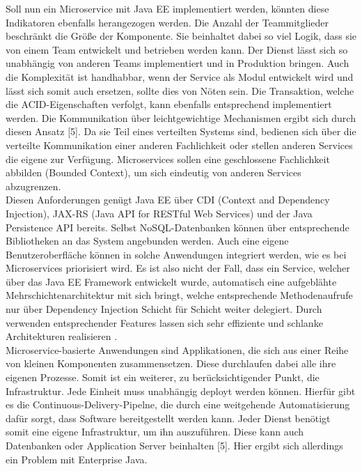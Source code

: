 Soll nun ein Microservice mit Java EE implementiert werden, könnten diese Indikatoren ebenfalls herangezogen werden. Die Anzahl der Teammitglieder beschränkt die Größe der Komponente. Sie beinhaltet dabei so viel Logik, dass sie von einem Team entwickelt und betrieben werden kann. Der Dienst lässt sich so unabhängig von anderen Teams implementiert und in Produktion bringen. Auch die Komplexität ist handhabbar, wenn der Service als Modul entwickelt wird und lässt sich somit auch ersetzen, sollte dies von Nöten sein. Die Transaktion, welche die ACID-Eigenschaften verfolgt, kann ebenfalls entsprechend implementiert werden. Die Kommunikation über leichtgewichtige Mechanismen ergibt sich durch diesen Ansatz [5]. Da sie Teil eines verteilten Systems sind, bedienen sich über die verteilte Kommunikation einer anderen Fachlichkeit oder stellen anderen Services die eigene zur Verfügung. Microservices sollen eine geschlossene Fachlichkeit abbilden (Bounded Context), um sich eindeutig von anderen Services abzugrenzen.\\ 
Diesen Anforderungen genügt Java EE über CDI (Context and Dependency Injection), JAX-RS (Java API for RESTful Web Services) und der Java Persistence API bereits. Selbst NoSQL-Datenbanken können über entsprechende Bibliotheken an das System angebunden werden. Auch eine eigene Benutzeroberfläche können in solche Anwendungen integriert werden, wie es bei Microservices priorisiert wird. Es ist also nicht der Fall, dass ein Service, welcher über das Java EE Framework entwickelt wurde, automatisch eine aufgeblähte Mehrschichtenarchitektur mit sich bringt, welche entsprechende Methodenaufrufe nur über Dependency Injection Schicht für Schicht weiter delegiert. Durch verwenden entsprechender Features lassen sich sehr effiziente und schlanke Architekturen realisieren \cite{jaxcenter.2016}.\\
Microservice-basierte Anwendungen sind Applikationen, die sich aus einer Reihe von kleinen Komponenten zusammensetzen. Diese durchlaufen dabei alle ihre eigenen Prozesse. Somit ist ein weiterer, zu berücksichtigender Punkt, die Infrastruktur. Jede Einheit muss unabhängig deployt werden können. Hierfür gibt es die Continuous-Delivery-Pipelne, die durch eine weitgehende Automatisierung dafür sorgt, dass Software bereitgestellt werden kann. Jeder Dienst benötigt somit eine eigene Infrastruktur, um ihn auszuführen. Diese kann auch Datenbanken oder Application Server beinhalten [5]. Hier ergibt sich allerdings ein Problem mit Enterprise Java.

